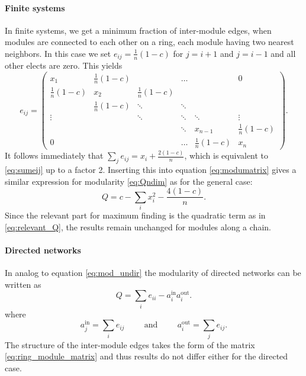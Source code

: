 \documentclass[openright,twoside,headsepline]{scrbook}
\begin{document}
\paragraph{Finite systems\color{Cayenne}{.}}
In finite systems, we get a minimum fraction of inter-module edges, when modules are connected to each other on a ring, each module having two nearest neighbors.
In this case we set  $e_{ij}= \frac{1}{n}(1-c)$ for $j=i+1$ and $j=i-1$ and all other elects are zero.
This yields
\begin{equation}\label{eq:ring_module_matrix}
e_{ij}=\left(\begin{array}{cccccc}
x_1 & \frac{1}{n}(1-c)&  & \hdots &  & 0 \\ 
\frac{1}{n}(1-c)& x_2 &\frac{1}{n}(1-c)&  &  &  \\
 & \frac{1}{n}(1-c) & \ddots & \ddots & & \\
\vdots &  & \ddots & \ddots & \ddots &\vdots \\
 & & & \ddots   &  x_{n-1} &\frac{1}{n}(1-c) \\
0 & &  & \hdots & \frac{1}{n}(1-c) & x_n
\end{array}
\right) .
\end{equation}
It follows immediately that $\sum _j e_{ij}=x_i+\frac{2(1-c)}{n}$, which is equivalent to \eqref{eq:sumeij} up to a factor 2.
Inserting this into equation \eqref{eq:modumatrix} gives a similar expression for modularity \eqref{eq:Qndim} as for the general case:
\begin{equation*}
Q=c-\sum _i x_i^2 - \frac{4(1-c)}{n} .
\end{equation*}
Since the relevant part for maximum finding is the quadratic term as in \eqref{eq:relevant_Q}, the results remain unchanged for modules along a chain.

\paragraph{Directed networks\color{Cayenne}{.}}
In analog to equation \eqref{eq:mod_undir} the modularity of directed networks can be written as \citep{Kao:2007}
\begin{equation}\label{eq:mod_directed}
Q=\sum _i e_{ii} - a_i ^{\text{in}} a_i ^{\text{out}}.
\end{equation}
where
\[
a_j ^\text{in}= \sum _i e_{ij} \hspace{1cm} \text{and} \hspace{1cm} a_i ^\text{out}= \sum _j e_{ij}.
\]
The structure of the inter-module edges takes the form of the matrix \eqref{eq:ring_module_matrix} and thus results do not differ either for the directed case.






\end{document}

